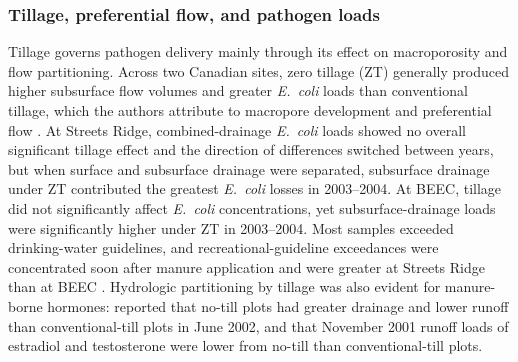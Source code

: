 \subsubsection{Tillage, preferential flow, and pathogen loads}
Tillage governs pathogen delivery mainly through its effect on macroporosity and flow partitioning. Across two Canadian sites, zero tillage (ZT) generally produced higher subsurface flow volumes and greater \textit{E.\ coli} loads than conventional tillage, which the authors attribute to macropore development and preferential flow \parencite{Thiagarajan2007}. At Streets Ridge, combined-drainage \textit{E.\ coli} loads showed no overall significant tillage effect and the direction of differences switched between years, but when surface and subsurface drainage were separated, subsurface drainage under ZT contributed the greatest \textit{E.\ coli} losses in 2003--2004. At BEEC, tillage did not significantly affect \textit{E.\ coli} concentrations, yet subsurface-drainage loads were significantly higher under ZT in 2003--2004. Most samples exceeded drinking-water guidelines, and recreational-guideline exceedances were concentrated soon after manure application and were greater at Streets Ridge than at BEEC \parencite{Thiagarajan2007}. Hydrologic partitioning by tillage was also evident for manure-borne hormones: \textcite{Jenkins2009} reported that no-till plots had greater drainage and lower runoff than conventional-till plots in June 2002, and that November 2001 runoff loads of estradiol and testosterone were lower from no-till than conventional-till plots.

